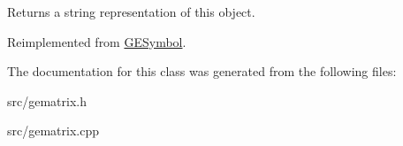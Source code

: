 Returns a string representation of this object. 



Reimplemented from \hyperlink{class_g_e_symbol_a6790ac75620cc1a9e37d67279e8bd4d1}{G\-E\-Symbol}.



The documentation for this class was generated from the following files\-:\begin{DoxyCompactItemize}
\item 
src/gematrix.\-h\item 
src/gematrix.\-cpp\end{DoxyCompactItemize}
